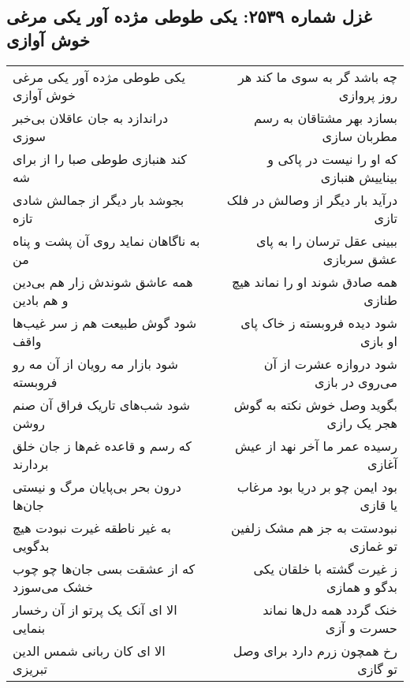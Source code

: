 \begin{center}
\section*{غزل شماره ۲۵۳۹: یکی طوطی مژده آور یکی مرغی خوش آوازی}
\label{sec:2539}
\begin{longtable}{l p{0.5cm} r}
یکی طوطی مژده آور یکی مرغی خوش آوازی
&&
چه باشد گر به سوی ما کند هر روز پروازی
\\
دراندازد به جان عاقلان بی‌خبر سوزی
&&
بسازد بهر مشتاقان به رسم مطربان سازی
\\
کند هنبازی طوطی صبا را از برای شه
&&
که او را نیست در پاکی و بیناییش هنبازی
\\
بجوشد بار دیگر از جمالش شادی تازه
&&
درآید بار دیگر از وصالش در فلک تازی
\\
به ناگاهان نماید روی آن پشت و پناه من
&&
ببینی عقل ترسان را به پای عشق سربازی
\\
همه عاشق شوندش زار هم بی‌دین و هم بادین
&&
همه صادق شوند او را نماند هیچ طنازی
\\
شود گوش طبیعت هم ز سر غیب‌ها واقف
&&
شود دیده فروبسته ز خاک پای او بازی
\\
شود بازار مه رویان از آن مه رو فروبسته
&&
شود دروازه عشرت از آن می‌روی در بازی
\\
شود شب‌های تاریک فراق آن صنم روشن
&&
بگوید وصل خوش نکته به گوش هجر یک رازی
\\
که رسم و قاعده غم‌ها ز جان خلق بردارند
&&
رسیده عمر ما آخر نهد از عیش آغازی
\\
درون بحر بی‌پایان مرگ و نیستی جان‌ها
&&
بود ایمن چو بر دریا بود مرغاب یا قازی
\\
به غیر ناطقه غیرت نبودت هیچ بدگویی
&&
نبودستت به جز هم مشک زلفین تو غمازی
\\
که از عشقت بسی جان‌ها چو چوب خشک می‌سوزد
&&
ز غیرت گشته با خلقان یکی بدگو و همازی
\\
الا ای آنک یک پرتو از آن رخسار بنمایی
&&
خنک گردد همه دل‌ها نماند حسرت و آزی
\\
الا ای کان ربانی شمس الدین تبریزی
&&
رخ همچون زرم دارد برای وصل تو گازی
\\
\end{longtable}
\end{center}

